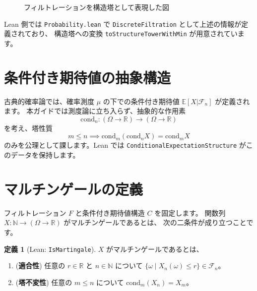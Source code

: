 \documentclass[12pt]{ltjsarticle}
\theoremstyle{definition}
\newtheorem{definition}{定義}[section]
\theoremstyle{plain}
\begin{document}
\begin{figure}[h]
  \centering
  \caption{フィルトレーションを構造塔として表現した図}
  \label{fig:tower}
\end{figure}

Lean 側では \texttt{Probability.lean} で
\texttt{DiscreteFiltration} として上述の情報が定義されており、
構造塔への変換 \texttt{toStructureTowerWithMin} が用意されています。

\section{条件付き期待値の抽象構造}

古典的確率論では、確率測度 $\mu$ の下での条件付き期待値
$\mathbb{E}[X|\mathcal{F}_n]$ が定義されます。
本ガイドでは測度論に立ち入らず、抽象的な作用素
\[
  \mathrm{cond}_n : (\Omega\to\mathbb{R}) \longrightarrow (\Omega\to\mathbb{R})
\]
を考え、塔性質
\[
  m\le n \implies \mathrm{cond}_m(\mathrm{cond}_n X) = \mathrm{cond}_m X
\]
のみを公理として課します。Lean では
\texttt{ConditionalExpectationStructure} がこのデータを保持します。

\section{マルチンゲールの定義}

フィルトレーション $F$ と条件付き期待値構造 $C$ を固定します。
関数列 $X:\mathbb{N}\to(\Omega\to\mathbb{R})$ がマルチンゲールであるとは、
次の二条件が成り立つことです。

\begin{definition}[Lean: \texttt{IsMartingale}]
\label{def:martingale}
  $X$ がマルチンゲールであるとは、
  \begin{enumerate}[label=(\roman*),leftmargin=1.5em]
    \item (\textbf{適合性}) 任意の $r\in\mathbb{R}$ と $n\in\mathbb{N}$ について
    $\{\omega\mid X_n(\omega)\le r\}\in \mathcal{F}_n$。
    \item (\textbf{塔不変性}) 任意の $m\le n$ について
    $\mathrm{cond}_m(X_n)=X_m$。
  \end{enumerate}
\end{definition}
\end{document}
